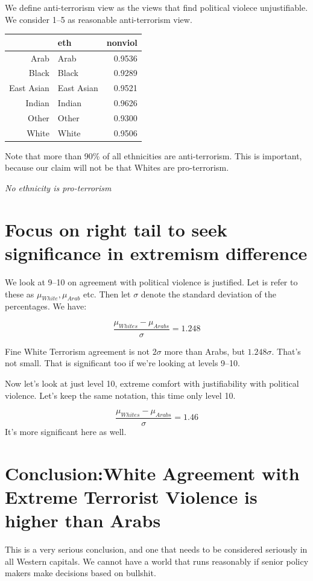 \documentclass{amsart}
\begin{document}
We define anti-terrorism view as the views that find political violece unjustifiable.  We consider 1--5 as reasonable anti-terrorism view.

\begin{table}[ht]
\centering
\begin{tabular}{rlr}
  \hline
 & eth & nonviol \\ 
  \hline
Arab & Arab & 0.9536 \\ 
  Black & Black & 0.9289 \\ 
  East Asian & East Asian & 0.9521 \\ 
  Indian & Indian & 0.9626 \\ 
  Other & Other & 0.9300 \\ 
  White & White & 0.9506 \\ 
   \hline
\end{tabular}
\end{table}

Note that more than 90\% of all ethnicities are anti-terrorism.  This is important, because our claim will not be that Whites are pro-terrorism.  

{\em No ethnicity is pro-terrorism}

\section{Focus on right tail to seek significance in extremism difference}

We look at 9--10 on agreement with political violence is justified.  Let is refer to these as $\mu_{White}, \mu_{Arab}$ etc.  Then let $\sigma$ denote the standard deviation of the percentages.  We have:

\[
\frac{\mu_{Whites} - \mu_{Arabs}}{\sigma} = 1.248
\]

Fine White Terrorism agreement is not $2\sigma$ more than Arabs, but $1.248\sigma$.  That's not small.  That is significant  too if we're looking at levels 9--10.

Now let's look at just level 10, extreme comfort with justifiability with political violence.  Let's keep the same notation, this time only level 10.

\[
\frac{\mu_{Whites} - \mu_{Arabs}}{\sigma} = 1.46
\]
It's more significant here as well.

\section{Conclusion:White Agreement with Extreme Terrorist Violence is higher than Arabs}

This is a very serious conclusion, and one that needs to be considered seriously in all Western capitals.  We cannot have a world that runs reasonably if senior policy makers make decisions based on bullshit.
\end{document}
